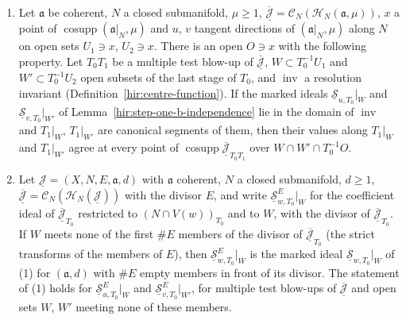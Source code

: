 \begin{theorem}
\label{mc:tangent-change-opens}
\leanok
\begin{enumerate}
\item Let \(\mathfrak a\) be coherent, \(N\) a closed submanifold, \(\mu\ge1\), \(\overline{\underline{\mathcal J}}=\mathcal C_N(\mathcal H_N(\mathfrak a,\mu))\), \(x\) a point of
\(\operatorname{cosupp}(\mathfrak a|_N,\mu)\) and \(u\), \(v\) tangent directions of \((\mathfrak a|_N,\mu)\) along \(N\) on open sets \(U_1\ni x\), \(U_2\ni x\). There is an open
\(O\ni x\) with the following property. Let \(T_0T_1\) be a multiple test blow-up of \(\overline{\underline{\mathcal J}}\), \(W\subset T_0^{-1}U_1\) and \(W'\subset T_0^{-1}U_2\)
open subsets of the last stage of \(T_0\), and \(\operatorname{inv}\) a resolution invariant (Definition~\ref{hir:centre-function}). If the marked ideals
\(\underline{\mathcal S}_{u,T_0}|_W\) and \(\underline{\mathcal S}_{v,T_0}|_{W'}\) of Lemma~\ref{hir:step-one-b-independence} lie in the domain of \(\operatorname{inv}\) and \(T_1|_W\),
\(T_1|_{W'}\) are canonical segments of them, then their values along \(T_1|_W\) and \(T_1|_{W'}\) agree at every point of
\(\operatorname{cosupp}\overline{\underline{\mathcal J}}_{T_0T_1}\) over \(W\cap W'\cap T_0^{-1}O\).
\item Let \(\underline{\mathcal J}=(X,N,E,\mathfrak a,d)\) with \(\mathfrak a\) coherent, \(N\) a closed submanifold, \(d\ge1\), \(\overline{\underline{\mathcal J}}=\mathcal C_N(\mathcal H_N(\underline{\mathcal J}))\)
with the divisor \(E\), and write \(\underline{\mathcal S}^E_{w,T_0}|_W\) for the coefficient ideal of \(\overline{\underline{\mathcal J}}_{T_0}\) restricted to
\((N\cap V(w))_{T_0}\) and to \(W\), with the divisor of \(\overline{\underline{\mathcal J}}_{T_0}\). If \(W\) meets none of the first \(\#E\) members of the divisor of
\(\overline{\underline{\mathcal J}}_{T_0}\) (the strict transforms of the members of \(E\)), then \(\underline{\mathcal S}^E_{w,T_0}|_W\) is the marked ideal
\(\underline{\mathcal S}_{w,T_0}|_W\) of (1) for \((\mathfrak a,d)\) with \(\#E\) empty members in front of its divisor. The statement of (1) holds for
\(\underline{\mathcal S}^E_{u,T_0}|_W\) and \(\underline{\mathcal S}^E_{v,T_0}|_{W'}\), for multiple test blow-ups of \(\overline{\underline{\mathcal J}}\) and open sets \(W\), \(W'\)
meeting none of these members.
\end{enumerate}
\end{theorem}
